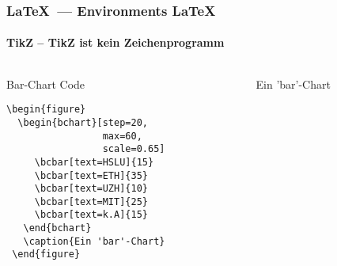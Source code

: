 \begin{frame}[fragile]
    \frametitle{\LaTeX~--- Environments \hfill{} LaTeX}
    \framesubtitle{TikZ -- TikZ ist kein Zeichenprogramm}
    \begin{columns}
        \begin{column}{5cm}
            \begin{block}{Bar-Chart Code}
                \begin{lstlisting}
\begin{figure}
  \begin{bchart}[step=20, 
                 max=60,
                 scale=0.65]
     \bcbar[text=HSLU]{15}
     \bcbar[text=ETH]{35}
     \bcbar[text=UZH]{10}
     \bcbar[text=MIT]{25}
     \bcbar[text=k.A]{15}
   \end{bchart}
   \caption{Ein 'bar'-Chart}
 \end{figure}
                \end{lstlisting}
            \end{block}
        \end{column}
        
        \begin{column}{6cm}
            \begin{figure}
                \begin{bchart}[step=10, max=40, scale=0.65]
                \end{bchart}
                \caption{Ein 'bar'-Chart}
            \end{figure}
        \end{column}
    \end{columns}
\end{frame}

